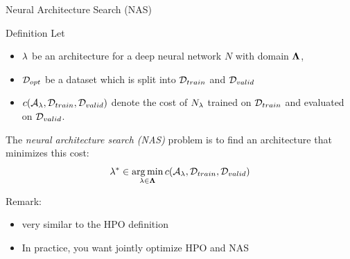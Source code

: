 \begin{frame}[c]{Neural Architecture Search (NAS)}

\begin{block}{Definition}
	Let 
	\begin{itemize}
		\item $\mathbf{\lambda}$ be \alert{an architecture for a deep neural network $N$} with domain $\mathbf{\Lambda}$,
		\item $\mathcal{D}_{opt}$ be a dataset which is split into $\mathcal{D}_{train}$ and $\mathcal{D}_{valid}$ 
		\item $c(\mathcal{A}_{\mathbf{\lambda}}, \mathcal{D}_{train}, \mathcal{D}_{valid})$ denote the cost of $N_{\mathbf{\lambda}}$ trained on $\mathcal{D}_{train}$ and evaluated on $\mathcal{D}_{valid}$.
	\end{itemize}
	The \emph{neural architecture search (NAS)} problem is to find an architecture that minimizes this cost:
	\begin{equation}
	\mathbf{\lambda}^* \in \operatorname*{arg\,min}_{\mathbf{\lambda} \in \mathbf{\Lambda}} c(\mathcal{A}_{\mathbf{\lambda}}, \mathcal{D}_{train}, \mathcal{D}_{valid}) \nonumber  
	\end{equation}
\end{block}

\pause
\smallskip
Remark:
\begin{itemize}
	\item very similar to the HPO definition
	\pause
	\item In practice, you want jointly optimize HPO and NAS~
\end{itemize}

\end{frame}
